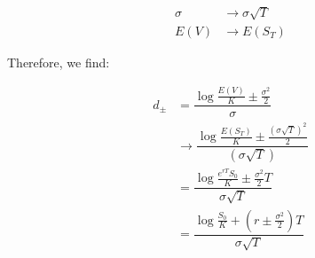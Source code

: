 \documentclass[uplatex]{jsarticle}
\begin{document}
\begin{align}
	\sigma & \to \sigma \sqrt{T} \\
	E(V) & \to E(S_T)
\end{align}

Therefore, we find:

\begin{align}
	d_{\pm} & = \dfrac{ \log \frac{E(V)}{K} \pm \frac{\sigma^{2}}{2} }{ \sigma } \\
	& \to \dfrac{ \log \frac{E(S_{T})}{K} \pm \frac{(\sigma \sqrt{T})^{2}}{2} }{ (\sigma \sqrt{T}) } \\
	& = \dfrac{ \log \frac{ e^{rT} S_{0} }{K} \pm \frac{\sigma^{2}}{2}T }{ \sigma \sqrt{T} } \\
	& = \dfrac{ \log \frac{S_{0}}{K} + ( r \pm \frac{\sigma^{2}}{2})T }{ \sigma \sqrt{T} }
\end{align}
\end{document}
